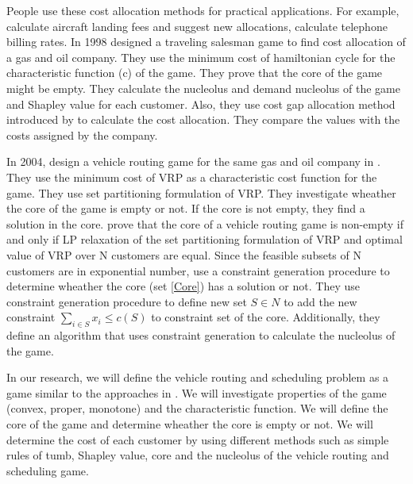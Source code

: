 People use these cost allocation methods for practical applications. For example, \citet{Littlechild}
calculate aircraft landing fees and suggest new allocations, \citet{Billera} calculate telephone billing 
rates. In 1998 \citeauthor{Engevall} designed a traveling 
salesman game to find cost allocation of a gas and oil company. They use the minimum cost of  
hamiltonian cycle for the characteristic function (c) of the game. They prove that the core 
of the game might be empty. They calculate the nucleolus and demand nucleolus of the game and 
Shapley value for each customer. Also, they use cost gap allocation method introduced by \citet{Tijs} 
to calculate the cost allocation. They compare the values with the costs
assigned by the company. 

In 2004, \citeauthor{Engevall2} design a vehicle routing game for the 
same gas and oil company in \citet{Engevall}. They use the minimum cost of VRP  
as a characteristic cost function for the game. They use set partitioning 
formulation of VRP. They investigate wheather the core of the game is empty or not. If the core
is not empty, they find a solution in the core.  %
\citet{Gothe-Lundgren} prove that
the core of a vehicle routing game is non-empty if and only if LP relaxation of the set 
partitioning formulation of VRP and optimal value of VRP over N customers are equal. Since the 
feasible subsets of N customers are in exponential number, \citet{Engevall2} use a constraint 
generation procedure to determine wheather the core (set \ref{Core}) 
has a solution or not. They use constraint generation procedure to define new set $S \in N$ 
to add the new constraint $\sum_{i \in S}x_i \leq c(S)$ to constraint set of the core.
Additionally, they define an algorithm that uses constraint generation to calculate the 
nucleolus of the game.

In our research, we will define the vehicle routing and scheduling problem as a game similar to  
the approaches in \citet{Engevall,Engevall2}. We will investigate properties
of the game (convex, proper, monotone) and the characteristic function. We will define the 
core of the game and determine wheather the core is empty or not. We will determine the cost
of each customer by using different methods such as simple rules of tumb, Shapley value,   
core and the nucleolus of the vehicle routing and scheduling game. 

